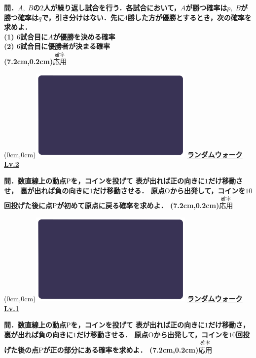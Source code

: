 \documentclass[10pt,
fleqn,
dvipdfmx,
uplatex
]{jsarticle}
\begin{document}
\small 
\bf\boldmath 問．$A,\;B$の$2$人が繰り返し試合を行う．各試合において，$A$が勝つ確率は$p,\;B$が勝つ確率は$q$で，引き分けはない．先に$4$勝した方が優勝とするとき，次の確率を求めよ．\\
(1)  $6$試合目に$A$が優勝を決める確率\\
(2)  $6$試合目に優勝者が決まる確率\\

\at(7.2cm,0.2cm){\small\color{bradorange}$\overset{\text{確率}}{\text{応用}}$}


\newpage



\at(0cm,0cm){\includegraphics[width=8cm,bb=0 0 1920 1080]{./youtube/thumbnails/templates/smart_background/確率.jpeg}}
{\color{orange}\bf\boldmath\Large\underline{ランダムウォーク Lv.2 }}\vspace{0.3zw}

\normalsize 
\bf\boldmath 問．数直線上の動点$\text{P}$を，コインを投げて
表が出れば正の向きに$1$だけ移動させ，
裏が出れば負の向きに$1$だけ移動させる．
原点$\text{O}$から出発して，コインを${10}$回投げた後に点$\text{P}$が初めて原点に戻る確率を求めよ．
\at(7.2cm,0.2cm){\small\color{bradorange}$\overset{\text{確率}}{\text{応用}}$}


\newpage



\at(0cm,0cm){\includegraphics[width=8cm,bb=0 0 1920 1080]{./youtube/thumbnails/templates/smart_background/確率.jpeg}}
{\color{orange}\bf\boldmath\Large\underline{ランダムウォーク Lv.1 }}\vspace{0.3zw}

\normalsize 
\bf\boldmath 問．数直線上の動点$\text{P}$を，コインを投げて
表が出れば正の向きに$1$だけ移動さ，
裏が出れば負の向きに$1$だけ移動させる．
原点$\text{O}$から出発して，コインを${10}$回投げた後の点$\text{P}$が正の部分にある確率を求めよ．
\at(7.2cm,0.2cm){\small\color{bradorange}$\overset{\text{確率}}{\text{応用}}$}
\end{document}
